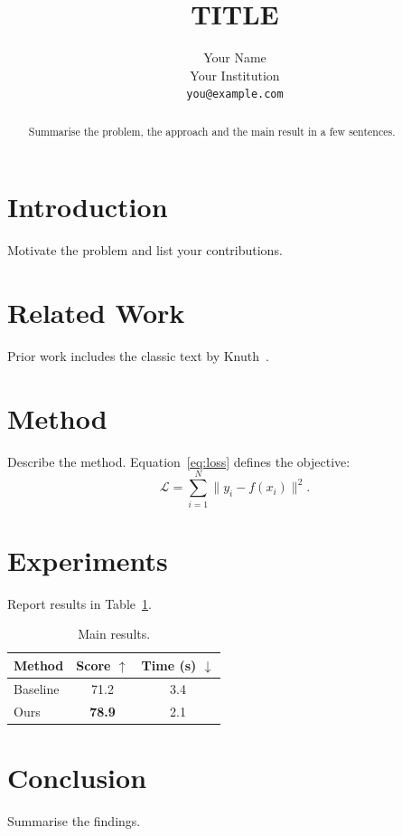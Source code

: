 \documentclass[10pt,twocolumn]{article}
\title{{{TITLE}}}
\author{Your Name\\Your Institution\\\texttt{you@example.com}}
\date{}
\begin{document}
\maketitle

\begin{abstract}
Summarise the problem, the approach and the main result in a few sentences.
\end{abstract}

\section{Introduction}
\label{sec:intro}
Motivate the problem and list your contributions.

\section{Related Work}
\label{sec:related}
Prior work includes the classic text by Knuth~\cite{knuth1984}.

\section{Method}
\label{sec:method}
Describe the method. Equation~\eqref{eq:loss} defines the objective:
\begin{equation}
  \mathcal{L} = \sum_{i=1}^{N} \lVert y_i - f(x_i) \rVert^2 .
  \label{eq:loss}
\end{equation}

\section{Experiments}
\label{sec:experiments}
Report results in Table~\ref{tab:results}.

\begin{table}[t]
  \centering
  \caption{Main results.}
  \label{tab:results}
  \begin{tabular}{lcc}
    \toprule
    Method & Score $\uparrow$ & Time (s) $\downarrow$ \\
    \midrule
    Baseline & 71.2 & 3.4 \\
    Ours & \textbf{78.9} & 2.1 \\
    \bottomrule
  \end{tabular}
\end{table}

\section{Conclusion}
\label{sec:conclusion}
Summarise the findings.



\end{document}
